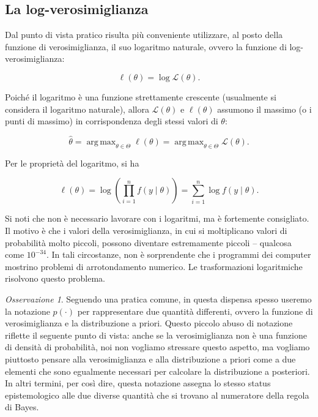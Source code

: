 \documentclass[
  11pt,
]{krantz}
\DeclareMathOperator{\argmax}{arg\,max} %
\theoremstyle{definition}
\theoremstyle{definition}
\theoremstyle{definition}
\theoremstyle{definition}
\theoremstyle{remark}
\newtheorem*{remark}{Osservazione}
\begin{document}
\hypertarget{la-log-verosimiglianza}{%
\subsection{La log-verosimiglianza}\label{la-log-verosimiglianza}}

Dal punto di vista pratico risulta più conveniente utilizzare, al posto della funzione di verosimiglianza, il suo logaritmo naturale, ovvero la funzione di log-verosimiglianza:

\begin{equation}
\ell(\theta) = \log \mathcal{L}(\theta).
\end{equation}

Poiché il logaritmo è una funzione strettamente crescente (usualmente si considera il logaritmo naturale), allora \(\mathcal{L}(\theta)\) e \(\ell(\theta)\) assumono il massimo (o i punti di massimo) in corrispondenza degli stessi valori di \(\theta\):

\[
\hat{\theta} = \argmax_{\theta \in \Theta} \ell(\theta) = \argmax_{\theta \in \Theta} \mathcal{L}(\theta).
\]

Per le proprietà del logaritmo, si ha

\begin{equation}
\ell(\theta) = \log \left( \prod_{i = 1}^n f(y \mid \theta) \right) = \sum_{i = 1}^n \log f(y \mid \theta).
\end{equation}

Si noti che non è necessario lavorare con i logaritmi, ma è fortemente consigliato. Il motivo è che i valori della verosimiglianza, in cui si moltiplicano valori di probabilità molto piccoli, possono diventare estremamente piccoli -- qualcosa come \(10^{-34}\). In tali circostanze, non è sorprendente che i programmi dei computer mostrino problemi di arrotondamento numerico. Le trasformazioni logaritmiche risolvono questo problema.

\begin{remark}
Seguendo una pratica comune, in questa dispensa spesso useremo la notazione \(p(\cdot)\) per rappresentare due quantità differenti, ovvero la funzione di verosimiglianza e la distribuzione a priori. Questo piccolo abuso di notazione riflette il seguente punto di vista: anche se la verosimiglianza non è una funzione di densità di probabilità, noi non vogliamo stressare questo aspetto, ma vogliamo piuttosto pensare alla verosimiglianza e alla distribuzione a priori come a due elementi che sono egualmente necessari per calcolare la distribuzione a posteriori. In altri termini, per così dire, questa notazione assegna lo stesso status epistemologico alle due diverse quantità che si trovano al numeratore della regola di Bayes.
\end{remark}
\end{document}
